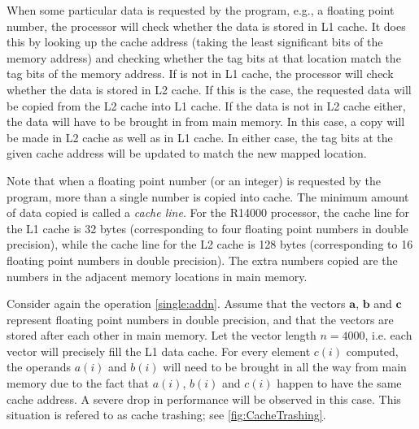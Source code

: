When some particular data is requested by the program, e.g., a floating point
number, the processor will check whether the data is stored in L1 cache. It does
this by looking up the cache address (taking the least significant bits of the
memory address) and checking whether the tag bits at that location match the tag
bits of the memory address. If is not in L1 cache, the processor will check
whether the data is stored in L2 cache. If this is the case, the requested data
will be copied from the L2 cache into L1 cache. If the data is not in L2 cache
either, the data will have to be brought in from main memory. In this case, a
copy will be made in L2 cache as well as in L1 cache. In either case, the tag
bits at the given cache address will be updated to match the new mapped
location.

Note that when a floating point number (or an integer) is requested by the
program, more than a single number is copied into cache. The minimum amount of
data copied is called a {\em cache line}. For the R14000 processor, the cache
line for the L1 cache is 32 bytes (corresponding to four floating point numbers
in double precision), while the cache line for the L2 cache is 128 bytes
(corresponding to 16 floating point numbers in double precision). The extra
numbers copied are the numbers in the adjacent memory locations in main memory.

Consider again the operation \eqref{single:addn}. Assume that the vectors $\bm
a$, $\bm b$ and $\bm c$ represent floating point numbers in double precision,
and that the vectors are stored after each other in main memory. Let the vector
length $n=4000$, i.e. each vector will precisely fill the L1 data cache. For
every element $c(i)$ computed, the operands $a(i)$ and $b(i)$ will need to be
brought in all the way from main memory due to the fact that $a(i)$, $b(i)$ and
$c(i)$ happen to have the same cache address. A severe drop in performance will
be observed in this case. This situation is refered to as cache trashing; see
\autoref{fig:CacheTrashing}.

